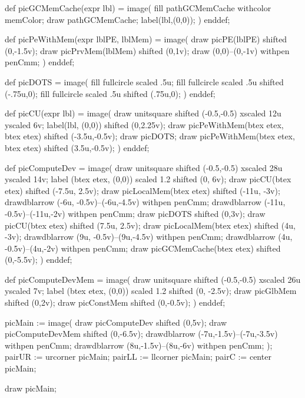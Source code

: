 def picGCMemCache(expr lbl) =
image(
fill pathGCMemCache withcolor memColor;
draw pathGCMemCache;
label(lbl,(0,0));
)
enddef;

def picPeWithMem(expr lblPE, lblMem) =
image(
draw picPE(lblPE) shifted (0,-1.5v);
draw picPrvMem(lblMem) shifted (0,1v);
draw (0,0)--(0,-1v) withpen penCmm;
)
enddef;

def picDOTS =
image(
fill fullcircle scaled .5u;
fill fullcircle scaled .5u shifted (-.75u,0);
fill fullcircle scaled .5u shifted (.75u,0);
)
enddef;

def picCU(expr lbl) =
image(
	draw unitsquare shifted (-0.5,-0.5) xscaled 12u yscaled 6v;
	label(lbl, (0,0)) shifted (0,2.25v);
	draw picPeWithMem(btex  etex, btex  etex) shifted (-3.5u,-0.5v);
	draw picDOTS;
	draw picPeWithMem(btex  etex, btex  etex) shifted (3.5u,-0.5v);
)
enddef;

def picComputeDev =
image(
	draw unitsquare shifted (-0.5,-0.5) xscaled 28u yscaled 14v;
	label (btex  etex, (0,0)) scaled 1.2 shifted (0, 6v);
	draw picCU(btex  etex) shifted (-7.5u, 2.5v);
	draw picLocalMem(btex  etex) shifted (-11u, -3v);
	drawdblarrow (-6u, -0.5v)--(-6u,-4.5v) withpen penCmm;
	drawdblarrow (-11u, -0.5v)--(-11u,-2v) withpen penCmm;
	draw picDOTS shifted (0,3v);
	draw picCU(btex  etex) shifted (7.5u, 2.5v);
	draw picLocalMem(btex  etex) shifted (4u, -3v);
	drawdblarrow (9u, -0.5v)--(9u,-4.5v) withpen penCmm;
	drawdblarrow (4u, -0.5v)--(4u,-2v) withpen penCmm;
	draw picGCMemCache(btex  etex) shifted (0,-5.5v);
)
enddef;

def picComputeDevMem =
image(
	draw unitsquare shifted (-0.5,-0.5) xscaled 26u yscaled 7v;
	label (btex  etex, (0,0)) scaled 1.2 shifted (0, -2.5v);
	draw picGlbMem shifted (0,2v);
	draw picConstMem shifted (0,-0.5v);
)
enddef;

picMain := image(
	draw picComputeDev shifted (0,5v);
	draw picComputeDevMem shifted (0,-6.5v);
	drawdblarrow (-7u,-1.5v)--(-7u,-3.5v) withpen penCmm;
	drawdblarrow (8u,-1.5v)--(8u,-6v) withpen penCmm;
);
pairUR := urcorner picMain;
pairLL := llcorner picMain;
pairC := center picMain;


draw picMain;
\stopreusableMPgraphic
